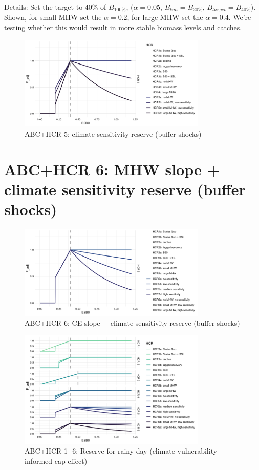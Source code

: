 \documentclass[
]{article}
\begin{document}
Details: Set the target to 40\% of \(B_{100\%}\), (\(\alpha = 0.05\),
\(B_{lim} = B_{20\%}\), \(B_{target} = B_{40\%}\)). Shown, for small MHW
set the \(\alpha = 0.2\), for large MHW set the \(\alpha = 0.4\). We're
testing whether this would result in more stable biomass levels and
catches.

\begin{figure}
\centering
\includegraphics[width=0.8\textwidth,height=\textheight]{../../Figs/HCR_figs/HCR5.png}
\caption{ABC+HCR 5: climate sensitivity reserve (buffer shocks)}
\end{figure}

\section{ABC+HCR 6: MHW slope + climate sensitivity reserve (buffer
shocks)}\label{abchcr-6-mhw-slope-climate-sensitivity-reserve-buffer-shocks}

\begin{figure}
\centering
\includegraphics[width=0.8\textwidth,height=\textheight]{../../Figs/HCR_figs/HCR6.png}
\caption{ABC+HCR 6: CE slope + climate sensitivity reserve (buffer
shocks)}
\end{figure}

\begin{figure}
\centering
\includegraphics[width=0.8\textwidth,height=\textheight]{../../Figs/HCR_figs/HCR1TO6.png}
\caption{ABC+HCR 1- 6: Reserve for rainy day (climate-vulnerability
informed cap effect)}
\end{figure}
\end{document}
